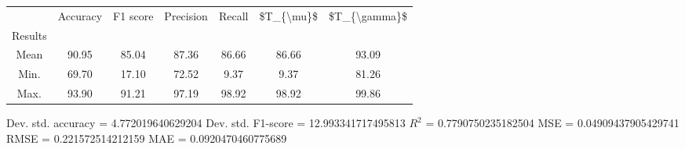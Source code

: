 \begin{tabular}{|c|c|c|c|c|c|c|}
\toprule
{} &  Accuracy &  F1 score &  Precision &  Recall &  \$T\_\{\textbackslash mu\}\$ &  \$T\_\{\textbackslash gamma\}\$ \\
Results &           &           &            &         &            &               \\
\hline
Mean    &     90.95 &     85.04 &      87.36 &   86.66 &      86.66 &         93.09 \\
Min.    &     69.70 &     17.10 &      72.52 &    9.37 &       9.37 &         81.26 \\
Max.    &     93.90 &     91.21 &      97.19 &   98.92 &      98.92 &         99.86 \\
\bottomrule
\end{tabular}

 Dev. std. accuracy = 4.772019640629204
 Dev. std. F1-score = 12.993341717495813
 $R^2$ = 0.7790750235182504
 MSE = 0.04909437905429741
 RMSE = 0.221572514212159
 MAE = 0.0920470460775689